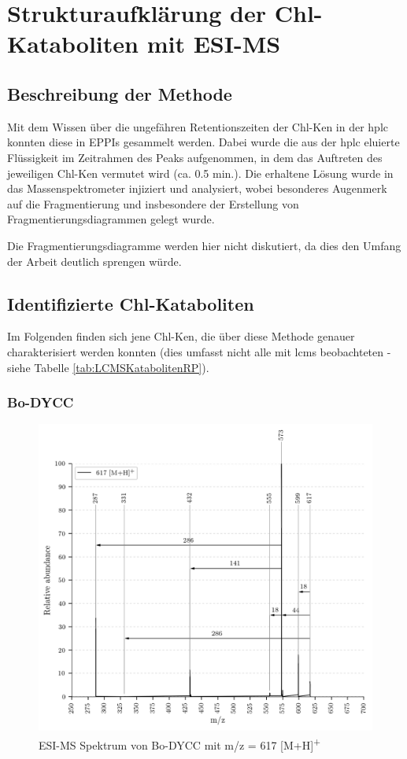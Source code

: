 \chapter{Strukturaufklärung der Chl-Kataboliten mit ESI-MS} \label{sec:ChlKatabolitenESIMS}

\section{Beschreibung der Methode}

Mit dem Wissen über die ungefähren Retentionszeiten der \gls{Chl-K}en in der \gls{hplc} konnten diese in EPPIs gesammelt werden. Dabei wurde die aus der \gls{hplc} eluierte Flüssigkeit im Zeitrahmen des Peaks aufgenommen, in dem das Auftreten des jeweiligen \gls{Chl-K}en vermutet wird (ca. 0.5 min.). Die erhaltene Lösung wurde in das Massenspektrometer injiziert und analysiert, wobei besonderes Augenmerk auf die Fragmentierung und insbesondere der Erstellung von Fragmentierungsdiagrammen gelegt wurde. 

Die Fragmentierungsdiagramme werden hier nicht diskutiert, da dies den Umfang der Arbeit deutlich sprengen würde. 

\section{Identifizierte Chl-Kataboliten}

Im Folgenden finden sich jene \gls{Chl-K}en, die über diese Methode genauer charakterisiert werden konnten (dies umfasst nicht alle mit \gls{lcms} beobachteten - siehe Tabelle \ref{tab:LCMSKatabolitenRP}). 

\subsection{Bo-DYCC}

\begin{figure}[!htbp]
  \centering
  \includegraphics[width=\textwidth, height=0.6\textwidth]{figures/Kapitel7/Kataboliten/VWA_MS_617.png}
  \caption[ESI-MS Spektrum von Bo-DYCC, Quelle: Autor]{ESI-MS Spektrum von Bo-DYCC mit m/z = 617 [M+H]\textsuperscript{+}}
  \label{fig:617MH}
\end{figure}

